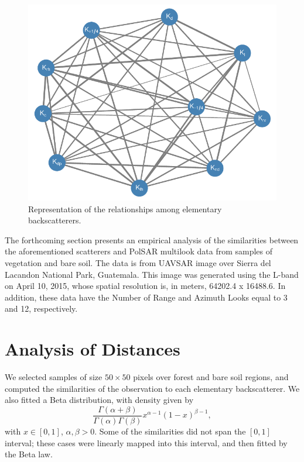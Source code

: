 \documentclass[conference]{IEEEtran}
\begin{document}
\begin{figure}[hbt]
\centering
\includegraphics[width=.95\linewidth]{network}
\caption{Representation of the relationships among elementary backscatterers.}\label{fig:Network}
\end{figure}

The forthcoming section presents an empirical analysis of the similarities between the aforementioned scatterers and PolSAR multilook data from samples of vegetation and bare soil.
The data is from UAVSAR image over Sierra del Lacandon National Park, Guatemala. This image was generated using the L-band on April 10, 2015, whose spatial resolution is, in meters, 64202.4 x 16488.6. In addition, these data have the Number of Range and Azimuth Looks equal to 3 and 12, respectively.


\section{Analysis of Distances}

We selected samples of size $50\times 50$ pixels over forest and bare soil regions, and computed the similarities of the observation to each elementary backscatterer.
We also fitted a Beta distribution, with density given by
$$
\frac{\Gamma(\alpha+\beta)}{\Gamma(\alpha)\Gamma(\beta)}x^{\alpha-1}(1-x)^{\beta-1},
$$
with $x \in [ 0,1]$, $\alpha,\beta>0$.
Some of the similarities did not span the $[0,1]$ interval;
these cases were linearly mapped into this interval, and then fitted by the Beta law.
\end{document}
